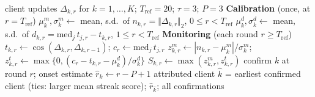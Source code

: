 \begin{algorithm}[t]
\caption{FedTrace v3 forensic monitor (frozen; evaluated, not proposed)}
\label{alg:fedtrace}
\footnotesize
\begin{algorithmic}[1]
\Require client updates $\Delta_{k,r}$ for $k=1,\dots,K$; $T_{\mathrm{ref}}=20$; $\tau=3$; $P=3$
\Statex \textbf{Calibration} (once, at $r=T_{\mathrm{ref}}$)
  \State $\mu^m_k,\sigma^m_k \gets$ mean, s.d.\ of $n_{k,r}=\Vert\Delta_{k,r}\Vert_2$, $0\le r<T_{\mathrm{ref}}$
  \State $\mu^d_k,\sigma^d_k \gets$ mean, s.d.\ of $d_{k,r}=\mathrm{med}_j\,t_{j,r}-t_{k,r}$, $1\le r<T_{\mathrm{ref}}$
\EndFor
\Statex \textbf{Monitoring} (each round $r\ge T_{\mathrm{ref}}$)
  \State $t_{k,r}\gets\cos(\Delta_{k,r},\Delta_{k,r-1})$;\; $c_r\gets\mathrm{med}_{j}\,t_{j,r}$ 
  \State $z^m_{k,r}\gets|n_{k,r}-\mu^m_k|/\sigma^m_k$;\; $z^t_{k,r}\gets\max\{0,(c_r-t_{k,r}-\mu^d_k)/\sigma^d_k\}$
  \State $S_{k,r}\gets\max(z^m_{k,r},z^t_{k,r})$
    \State confirm $k$ at round $r$; onset estimate $\hat r_k\gets r-P+1$
  \EndIf
\EndFor
\State \Return attributed client $\hat k$ = earliest confirmed client (ties: larger mean streak score); $\hat r_{\hat k}$; all confirmations
\end{algorithmic}
\end{algorithm}

